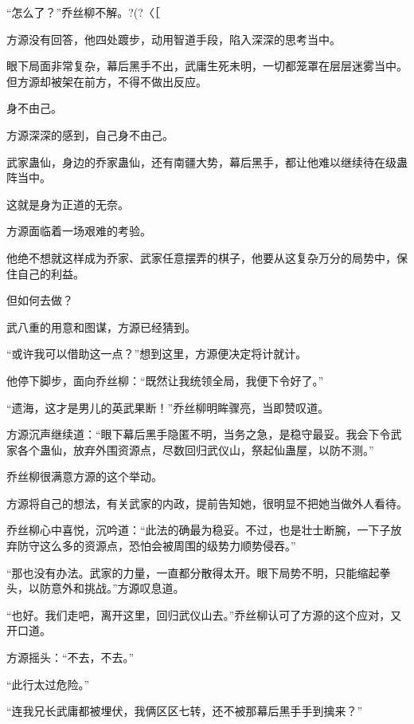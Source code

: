 
\begin{this_body}



“怎么了？”乔丝柳不解。?(?〈［

方源没有回答，他四处踱步，动用智道手段，陷入深深的思考当中。

眼下局面非常复杂，幕后黑手不出，武庸生死未明，一切都笼罩在层层迷雾当中。但方源却被架在前方，不得不做出反应。

身不由己。

方源深深的感到，自己身不由己。

武家蛊仙，身边的乔家蛊仙，还有南疆大势，幕后黑手，都让他难以继续待在级蛊阵当中。

这就是身为正道的无奈。

方源面临着一场艰难的考验。

他绝不想就这样成为乔家、武家任意摆弄的棋子，他要从这复杂万分的局势中，保住自己的利益。

但如何去做？

武八重的用意和图谋，方源已经猜到。

“或许我可以借助这一点？”想到这里，方源便决定将计就计。

他停下脚步，面向乔丝柳：“既然让我统领全局，我便下令好了。”

“遗海，这才是男儿的英武果断！”乔丝柳明眸骤亮，当即赞叹道。

方源沉声继续道：“眼下幕后黑手隐匿不明，当务之急，是稳守最妥。我会下令武家各个蛊仙，放弃外围资源点，尽数回归武仪山，祭起仙蛊屋，以防不测。”

乔丝柳很满意方源的这个举动。

方源将自己的想法，有关武家的内政，提前告知她，很明显不把她当做外人看待。

乔丝柳心中喜悦，沉吟道：“此法的确最为稳妥。不过，也是壮士断腕，一下子放弃防守这么多的资源点，恐怕会被周围的级势力顺势侵吞。”

“那也没有办法。武家的力量，一直都分散得太开。眼下局势不明，只能缩起拳头，以防意外和挑战。”方源叹息道。

“也好。我们走吧，离开这里，回归武仪山去。”乔丝柳认可了方源的这个应对，又开口道。

方源摇头：“不去，不去。”

“此行太过危险。”

“连我兄长武庸都被埋伏，我俩区区七转，还不被那幕后黑手手到擒来？”


\end{this_body}
